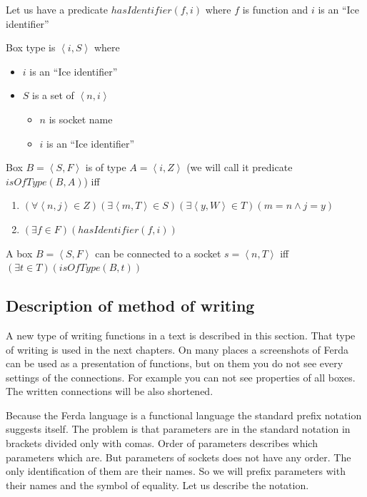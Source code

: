 \documentclass[a4paper,12pt]{book}
\begin{document}
\begin{mydef}
Let us have a predicate $hasIdentifier(f,i)$ where $f$ is function and $i$ is an ``Ice identifier''
\end{mydef}

\begin{mydef}
Box type is $\left<i,S\right>$ where
\begin{itemize}
	\item $i$ is an ``Ice identifier''
	\item $S$ is a set of $\left<n,i\right>$
	\begin{itemize}
		\item $n$ is socket name
		\item $i$ is an ``Ice identifier''
	\end{itemize}
\end{itemize}
\end{mydef}

\begin{mydef}
Box $B=\left<S,F\right>$ is of type $A=\left<i,Z\right>$ (we will call it predicate $isOfType(B,A)$) iff 
\begin{enumerate}
	\item $(\forall \left<n,j\right>\in Z)(\exists \left<m,T\right>\in S)(\exists \left<y,W\right>\in T)(m=n \wedge j=y)$
	\item $(\exists f\in F)(hasIdentifier(f,i))$
\end{enumerate}
\end{mydef}

\begin{mydef}
A box $B=\left<S,F\right>$ can be connected to a socket $s=\left<n,T\right>$ iff $(\exists t\in T)(isOfType(B,t))$
\end{mydef}

\subsection{Description of method of writing}
\label{sec:formalisation}
A new type of writing functions in a text is described in this section. That type of writing is used in the next chapters. On many places a screenshots of Ferda can be used as a presentation of functions, but on them you do not see every settings of the connections. For example you can not see properties of all boxes. The written connections will be also shortened.

Because the Ferda language is a functional language the standard prefix notation suggests itself. The problem is that parameters are in the standard notation in brackets divided only with comas. Order of parameters describes which parameters which are. But parameters of sockets does not have any order. The only identification of them are their names. So we will prefix parameters with their names and the symbol of equality. Let us describe the notation.
\end{document}
